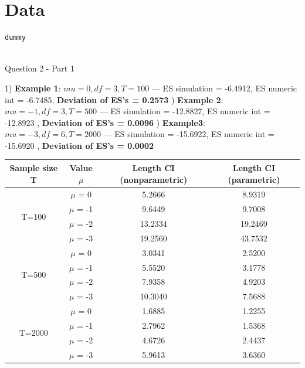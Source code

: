 \documentclass[12pt]{article}
\begin{document}
\section{Data}

\begin{Program}[!htb]
\begin{lstlisting}[style=Matlab-editor,basicstyle=\mlttfamily\footnotesize]
dummy
  
\end{lstlisting}
\caption{Question 2 - Part 1}
\label{Question 2 - Part 1}
\end{Program}


1) \textbf{Example 1}: $mu = 0, df = 3, T = 100$     \newline ---     ES simulation = -6.4912, ES numeric int = -6.7485,  \textbf{Deviation of ES's = 0.2573}  ) \textbf{Example 2}: $mu = -1, df =3, T = 500$ \newline --- ES simulation = -12.8827, ES numeric int = -12.8923 , \textbf{Deviation of ES's = 0.0096} ) \textbf{Example3}: $mu = -3, df = 6, T = 2000$  \newline--- ES simulation = -15.6922, ES numeric int = -15.6920 , \textbf{Deviation of ES's = 0.0002}\newline\newline

\begin{center}
\begin{tabular}{||c | c | c c||} 
 \hline
 Sample size T & Value $\mu$ & Length CI (nonparametric) & Length CI (parametric) \\ [0.5ex] 
 \hline\hline
 \multirow{4}{4em}{T=100} & $\mu$ = 0 & 5.2666 & 8.9319\\ 
& $\mu$ = -1 & 9.6449 & 9.7008 \\ 
& $\mu$ = -2 & 13.2334 & 19.2469 \\ 
& $\mu$ = -3 & 19.2560 & 43.7532 \\ 
 \hline
 \multirow{4}{4em}{T=500} & $\mu$ = 0 & 3.0341 & 2.5200\\ 
& $\mu$ = -1 & 5.5520 & 3.1778 \\ 
& $\mu$ = -2 & 7.9358 & 4.9203 \\ 
& $\mu$ = -3 & 10.3040 & 7.5688 \\ 
 \hline
 \multirow{4}{4em}{T=2000} & $\mu$ = 0 & 1.6885 & 1.2255\\ 
& $\mu$ = -1 & 2.7962 & 1.5368 \\ 
& $\mu$ = -2 & 4.6726 & 2.4437 \\ 
& $\mu$ = -3 & 5.9613 & 3.6360 \\ 
 \hline
\end{tabular}
\end{center}
\end{document}
